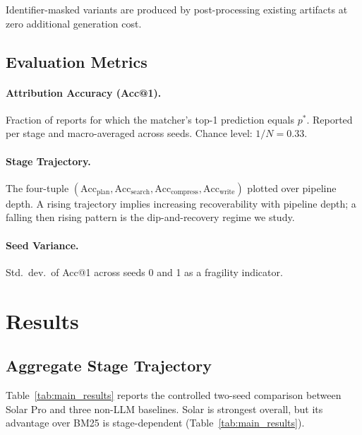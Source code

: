\documentclass[]{article}
\begin{document}
Identifier-masked variants are produced by post-processing existing artifacts
at zero additional generation cost.

\subsection{Evaluation Metrics}

\paragraph{Attribution Accuracy (Acc@1).}
Fraction of reports for which the matcher's top-1 prediction equals $p^*$.
Reported per stage and macro-averaged across seeds. Chance level: $1/N = 0.33$.

\paragraph{Stage Trajectory.}
The four-tuple $(\mathrm{Acc}_{\text{plan}}, \mathrm{Acc}_{\text{search}}, \mathrm{Acc}_{\text{compress}}, \mathrm{Acc}_{\text{write}})$ plotted over pipeline depth.
A rising trajectory implies increasing recoverability with pipeline depth;
a falling then rising pattern is the dip-and-recovery regime we study.

\paragraph{Seed Variance.}
Std.\ dev.\ of Acc@1 across seeds 0 and 1 as a fragility indicator.

\section{Results}
\label{sec:results}

\subsection{Aggregate Stage Trajectory}

Table~\ref{tab:main_results} reports the controlled two-seed comparison
between Solar Pro and three non-LLM baselines. Solar is strongest overall,
but its advantage over BM25 is stage-dependent
(Table~\ref{tab:main_results}).
\end{document}
